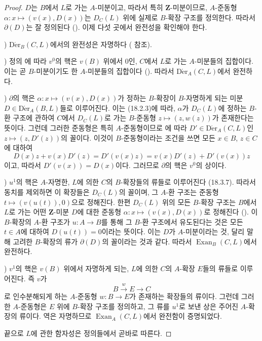 \begin{proof}
$D$는 $B$에서 $L$로 가는 $A$-미분이고, 따라서 특히
$\mathbf Z$-미분이므로, $A$-준동형
$\alpha:x\mapsto(v(x),D(x))$는 $D_C(L)$ 위에 실제로 $B$-확장 구조를
정의한다. 따라서 $\partial(D)$는 잘 정의된다
(). 이제 다섯 곳에서 완전성을 확인해야 한다.

\medskip
{})\enspace
$\operatorname{D\acute{e}r}_B(C,L)$에서의 완전성은 자명하다
( 참조).

\medskip
{})\enspace
정의 에 따라 $v^0$의 핵은 $v(B)$ 위에서 $0$인,
$C$에서 $L$로 가는 $A$-미분들의 집합이다. 이는 곧 $B$-미분이기도
한 $A$-미분들의 집합이다 (). 따라서
$\operatorname{D\acute{e}r}_A(C,L)$에서 완전하다.

\medskip
{})\enspace
$\partial$의 핵은 $\alpha:x\mapsto(v(x),D(x))$가 정하는 $B$-확장이
$B$-자명하게 되는 미분
$D\in\operatorname{D\acute{e}r}_A(B,L)$들로 이루어진다. 이는
(18.2.3)에 따라, $\alpha$가 $D_C(L)$에 정하는 $B$-환 구조에 관하여
$C$에서 $D_C(L)$로 가는 $B$-준동형 $z\mapsto(z,w(z))$가 존재한다는
뜻이다. 그런데 그러한 준동형은 특히 $A$-준동형이므로
에 따라
$D'\in\operatorname{D\acute{e}r}_A(C,L)$인
$z\mapsto(z,D'(z))$의 꼴이다. 이것이 $B$-준동형이라는 조건을 쓰면
모든 $x\in B$, $z\in C$에 대하여
\[
  D(x)z+v(x)D'(z)=D'(v(x)z)=v(x)D'(z)+D'(v(x))z
\]
이고, 따라서 $D'(v(x))=D(x)$이다. 그러므로 $\partial$의 핵은
$v^0$의 상이다.

\medskip
{})\enspace
$u^1$의 핵은 $A$-자명한, $L$에 의한 $C$의 $B$-확장들의 류들로
이루어진다 (18.3.7). 따라서 동치를 제외하면 이 확장들은
$D_C(L)$의 꼴이며, 그 $A$-환 구조는 준동형
$t\mapsto(v(u(t)),0)$으로 정해진다. 한편 $D_C(L)$ 위의 모든
$B$-확장 구조는 $B$에서 $L$로 가는 어떤 $\mathbf Z$-미분 $D$에
대한 준동형 $\alpha:x\mapsto(v(x),D(x))$로 정해진다
(). 이 $B$-확장의 $A$-환 구조가 $u:A\to B$를
통해 그 $B$-환 구조에서 유도된다는 것은 모든 $t\in A$에 대하여
$D(u(t))=0$이라는 뜻이다. 이는 $D$가 $A$-미분이라는 것, 달리 말해
고려한 $B$-확장의 류가 $\partial(D)$의 꼴이라는 것과 같다. 따라서
$\operatorname{Exan}_B(C,L)$에서 완전하다.

\medskip
{})\enspace
$v^1$의 핵은 $v(B)$ 위에서 자명하게 되는, $L$에 의한 $C$의
$A$-확장 $E$들의 류들로 이루어진다. 즉 $v$가
\[
  B\xrightarrow{w}E\longrightarrow C
\]
로 인수분해되게 하는 $A$-준동형 $w:B\to E$가 존재하는 확장들의
류이다. 그런데 그러한 $A$-준동형은 $E$ 위에 $B$-확장 구조를
정의하고, 그 류를 $u^1$로 보낸 상은 주어진 $A$-확장의 류이다.
역은 자명하므로 $\operatorname{Exan}_A(C,L)$에서 완전함이
증명되었다.

끝으로 $L$에 관한 함자성은 정의들에서 곧바로 따른다.
\end{proof}

